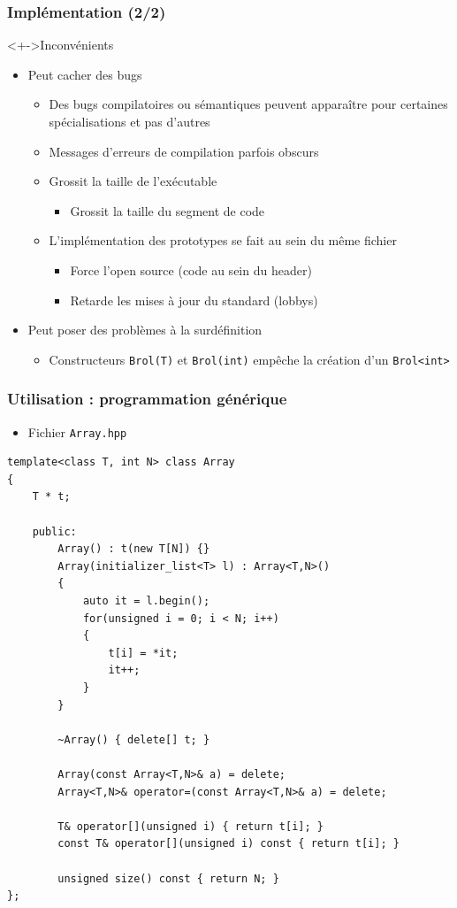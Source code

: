 \begin{frame}
\frametitle{Implémentation (2/2)}
\begin{alertblock}<+->{Inconvénients}
	\begin{itemize}[<+->]
	\item Peut cacher des bugs
		\begin{itemize}
		\item Des bugs compilatoires ou sémantiques peuvent apparaître pour certaines spécialisations et pas d'autres
		\item Messages d'erreurs de compilation parfois obscurs
		\item Grossit la taille de l'exécutable
			\begin{itemize}
			\item Grossit la taille du segment de code
			\end{itemize}
		\item L'implémentation des prototypes se fait au sein du même fichier
			\begin{itemize}
			\item Force l'open source (code au sein du header)
			\item Retarde les mises à jour du standard (lobbys)
			\end{itemize}
		\end{itemize}
	\item Peut poser des problèmes à la surdéfinition
		\begin{itemize}
		\item Constructeurs \lstinline|Brol(T)| et \lstinline|Brol(int)| empêche la création d'un \lstinline|Brol<int>|
		\end{itemize}
	\end{itemize}
\end{alertblock}
\end{frame}

\begin{frame}[containsverbatim]
\frametitle{Utilisation : programmation générique}
\begin{itemize}
\item Fichier \texttt{Array.hpp}
\end{itemize}
\begin{lstlisting}
template<class T, int N> class Array
{
	T * t;

	public:
		Array() : t(new T[N]) {}
		Array(initializer_list<T> l) : Array<T,N>()
		{
			auto it = l.begin();
			for(unsigned i = 0; i < N; i++)
			{
				t[i] = *it;
				it++;
			}
		}

		~Array() { delete[] t; }

		Array(const Array<T,N>& a) = delete;
		Array<T,N>& operator=(const Array<T,N>& a) = delete;

		T& operator[](unsigned i) { return t[i]; }
		const T& operator[](unsigned i) const { return t[i]; }

		unsigned size() const { return N; }
};
\end{lstlisting}
\end{frame}

